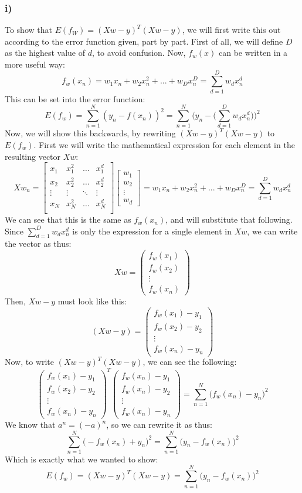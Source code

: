 \subsubsection{i)}
To show that $E(f_W)=(Xw-y)^T(Xw-y)$, we will first write this out according to the error function given, part by part. First of all, we will define $D$ as the highest value of $d$, to avoid confusion. Now, $f_w(x)$ can be written in a more useful way:
$$
f_w(x_n) = w_1x_n+w_2x_n^2+...+w_Dx_n^D = \sum_{d=1}^D w_d x_n^d
$$
This can be set into the error function:
$$
E(f_w) = \sum_{n=1}^N (y_n-f(x_n))^2 = \sum_{n=1}^N \Big(y_n-\Big(\sum_{d=1}^D w_d x_n^d\Big)\Big)^2
$$
Now, we will show this backwards, by rewriting $(Xw-y)^T(Xw-y)$ to $E(f_w)$. First we will write the mathematical expression for each element in the resulting vector $Xw$:
$$
Xw_n =
\left[
\begin{array}{llll}
x_1    & x_1^2  & \dots  & x_1^d  \\
x_2    & x_2^2  & \dots  & x_2^d  \\
\vdots & \vdots & \ddots & \vdots \\
x_N    & x_N^2  & \dots  & x_N^d  \\
\end{array}
\right]
\left[
\begin{array}{l}
w_1\\
w_2\\
\vdots\\
w_d
\end{array}
\right]
=
w_1x_n+w_2x_n^2+...+w_Dx_n^D = \sum_{d=1}^D w_d x_n^d
$$
We can see that this is the same as $f_w(x_n)$, and will substitute that following. Since $\sum_{d=1}^D w_d x_n^d$ is only the expression for a single element in $Xw$, we can write the vector as thus:
$$
Xw = 
\left(
\begin{array}{l}
f_w(x_1) \\
f_w(x_2) \\
\vdots \\
f_w(x_n)
\end{array}
\right)
$$
Then, $Xw-y$ must look like this:
$$
(Xw-y)= 
\left(
\begin{array}{l}
f_w(x_1)-y_1 \\
f_w(x_2)-y_2 \\
\vdots \\
f_w(x_n)-y_n
\end{array}
\right)
$$
Now, to write $(Xw-y)^T(Xw-y)$, we can see the following:
$$
\left(
\begin{array}{l}
f_w(x_1)-y_1 \\
f_w(x_2)-y_2 \\
\vdots \\
f_w(x_n)-y_n
\end{array}
\right)^T
\left(
\begin{array}{l}
f_w(x_n)-y_1 \\
f_w(x_n)-y_2 \\
\vdots \\
f_w(x_n)-y_n
\end{array}
\right)
= \sum_{n=1}^N\Big(f_w(x_n)-y_n\Big)^2
$$
We know that $a^n = (-a)^n$, so we can rewrite it as thus:
$$
\sum_{n=1}^N\Big(-f_w(x_n)+y_n\Big)^2 = \sum_{n=1}^N\Big(y_n-f_w(x_n)\Big)^2
$$
Which is exactly what we wanted to show:
$$
E(f_w) = (Xw-y)^T(Xw-y) = \sum_{n=1}^N\Big(y_n-f_w(x_n)\Big)^2
$$






